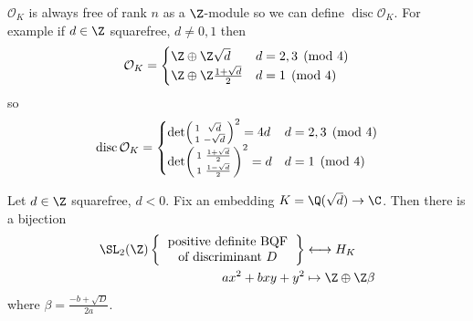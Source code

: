 \documentclass[a4paper]{article}
\renewcommand*{\O}{\mathcal{O}}
\DeclareMathOperator{\disc}{disc} %
\begin{document}
\begin{note}
  \(\O_K\) is always free of rank \(n\) as a \(\Z\)-module so we can define \(\disc \O_K\). For example if \(d \in \Z\) squarefree, \(d \neq 0, 1\) then
  \[
    \O_K =
    \begin{cases}
      \Z \oplus \Z \sqrt d & d = 2, 3 \pmod 4 \\
      \Z \oplus \Z \frac{1 + \sqrt d}{2} & d = 1 \pmod 4
    \end{cases}
  \]
  so
  \[
    \disc \O_K =
    \begin{cases}
      \det
      \begin{psmallmatrix}
        1 & \sqrt d \\
        1 & - \sqrt d
      \end{psmallmatrix}
      ^2 = 4d & d = 2, 3 \pmod 4 \\
      \det
      \begin{psmallmatrix}
        1 & \frac{1 + \sqrt d}{2} \\
        1 & \frac{1 - \sqrt d}{2}
      \end{psmallmatrix}
      ^2 = d & d = 1 \pmod 4 \\
    \end{cases}
  \]
\end{note}

\begin{theorem}
  \label{thm:bijection between SL2 orbits of BQF and class group}
  Let \(d \in \Z\) squarefree, \(d < 0\). Fix an embedding \(K = \Q(\sqrt d) \to \C\). Then there is a bijection
  \begin{align*}
    \SL_2(\Z)
    \left\{
    \begin{tabular}{c}
      positive definite BQF \\
      of discriminant \(D\)
    \end{tabular}
    \right\}
    &\longleftrightarrow H_K \\
    ax^2 + bxy + y^2 &\mapsto \Z \oplus \Z \beta
  \end{align*}
  where \(\beta = \frac{-b + \sqrt D}{2a}\).
\end{theorem}
\end{document}
